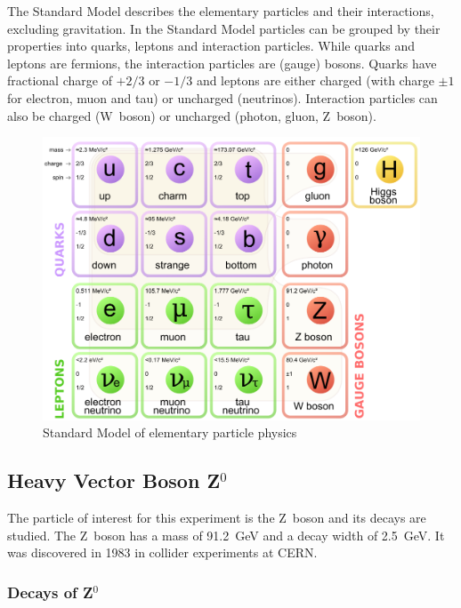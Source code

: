 \documentclass[11pt, a4paper]{article}
\numberwithin{equation}{section}
\begin{document}
The Standard Model describes the elementary particles and their interactions, excluding gravitation.
In the Standard Model particles can be grouped by their properties into quarks, leptons and interaction particles.
While quarks and leptons are fermions, the interaction particles are (gauge) bosons.
Quarks have fractional charge of $+2/3$ or $-1/3$ and leptons are either charged (with charge $\pm1$ for electron, muon and tau) or uncharged (neutrinos).
Interaction particles can also be charged (W~boson) or uncharged (photon, gluon, Z~boson).
\begin{figure}[h]
	\centering
	\includegraphics[width=.8\textwidth]{./figures/theory/standardmodel}
	\caption{Standard Model of elementary particle physics\protect\footnotemark}
	\label{fig:standard_model}
\end{figure}

\subsection{Heavy Vector Boson Z$^0$}

The particle of interest for this experiment is the Z~boson and its decays are studied.
The Z~boson has a mass of \SI{91.2}{GeV} and a decay width of \SI{2.5}{GeV}.
It was discovered in 1983 in collider experiments at CERN.

\subsubsection{Decays of Z$^0$}
\end{document}
